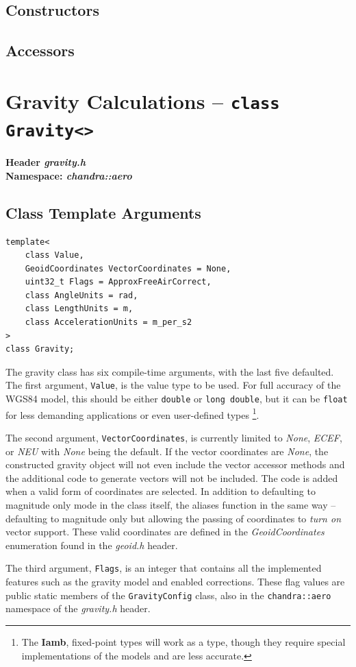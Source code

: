 \documentclass[10pt,letterpaper]{memoir} %
\newcommand{\apiheader}[2]{\noindent{}\textbf{Header \emph{#1}}\\\noindent{}\textbf{Namespace: \emph{#2}}}
\begin{document}
\subsection{Constructors}
\subsection{Accessors}

\section{Gravity Calculations -- \texttt{class Gravity<>}}
\label{sec::gravity:calculation::api}
\apiheader{gravity.h}{chandra::aero}
\subsection{Class Template Arguments}
\begin{verbatim}
template<
	class Value,
	GeoidCoordinates VectorCoordinates = None,
	uint32_t Flags = ApproxFreeAirCorrect,
	class AngleUnits = rad,
	class LengthUnits = m,
	class AccelerationUnits = m_per_s2
>
class Gravity;	
\end{verbatim}
The gravity class has six compile-time arguments, with the last five defaulted.  The first argument, \texttt{Value}, is the value type to be used.  For full accuracy of the WGS84 model, this should be either \texttt{double} or \texttt{long double}, but it can be \texttt{float} for less demanding applications or even user-defined types \footnote{The \textbf{Iamb}, fixed-point types will work as a type, though they require special implementations of the models and are less accurate.}.  

The second argument, \texttt{VectorCoordinates}, is currently limited to \emph{None}, \emph{ECEF}, or \emph{NEU} with \emph{None} being the default.  If the vector coordinates are \emph{None}, the constructed gravity object will not even include the vector accessor methods and the additional code to generate vectors will not be included.  The code is added when a valid form of coordinates are selected.  In addition to defaulting to magnitude only mode in the class itself, the aliases function in the same way -- defaulting to magnitude only but allowing the passing of coordinates to \emph{turn on} vector support.  These valid coordinates are defined in the \emph{GeoidCoordinates} enumeration found in the \emph{geoid.h} header.

The third argument, \texttt{Flags}, is an integer that contains all the implemented features such as the gravity model and enabled corrections.  These flag values are public static members of the \texttt{GravityConfig} class, also in the \texttt{chandra::aero} namespace of the \emph{gravity.h} header.   
\end{document}
